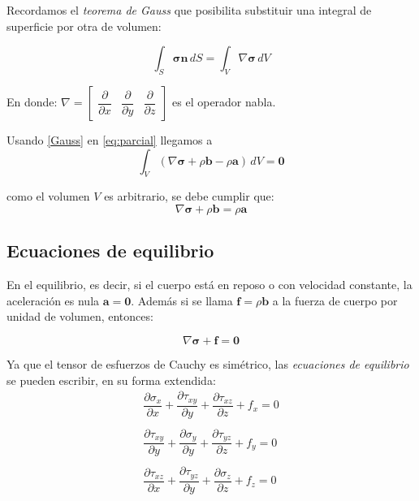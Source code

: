 	Recordamos el \textit{teorema de Gauss} que posibilita substituir una integral de superficie por otra de volumen:
	
	\begin{equation}
		\int_S \bm{\sigma} \mathbf{n} \, dS = \int_V \nabla
		\bm{\sigma} \, dV
		\label{Gauss}
	\end{equation}

En donde: $\nabla = \begin{bmatrix}
	\dfrac{\partial}{\partial x} & \dfrac{\partial}{\partial y} & \dfrac{\partial}{\partial z}
\end{bmatrix}$ es el operador nabla.
	
	Usando \eqref{Gauss} en \eqref{eq:parcial} llegamos a
	\begin{equation}
		\int_V \left( \nabla \bm{\sigma}  + \rho \mathbf{b} - \rho
		\mathbf{a} \right) \, dV = \mathbf{0}
	\end{equation}
	
	como el volumen $V$ es arbitrario, se debe cumplir que:
	\begin{equation}
		\nabla \bm{\sigma} + \rho \mathbf{b} = \rho \mathbf{a}
		\label{mov1}
	\end{equation}
	
	\subsection{Ecuaciones de equilibrio}
	
	En el equilibrio, es decir, si el cuerpo está en reposo o con velocidad constante, la aceleración es nula $\mathbf{a} = \mathbf{0}$. Además si se llama $\mathbf{f} = \rho \mathbf{b}$ a la fuerza de cuerpo por unidad de volumen, entonces:
	
	\begin{equation}
		\boxed{\nabla \bm{\sigma} + \mathbf{f} = \mathbf{0}}
		\label{eq:equil}
	\end{equation}
	
	Ya que el tensor de esfuerzos de Cauchy es simétrico, las \textit{ecuaciones de equilibrio} se pueden escribir, en su forma extendida:
	\begin{equation}
		\begin{array}{c}
			\dfrac{\partial \sigma_{x}}{\partial x} + \dfrac{\partial
				\tau_{xy}}{\partial y} + \dfrac{\partial \tau_{xz}}{\partial
				z} + f_x = 0 \\ \\
			\dfrac{\partial \tau_{xy}}{\partial y} + \dfrac{\partial
				\sigma_{y}}{\partial y} + \dfrac{\partial \tau_{yz}}{\partial
				z} + f_y = 0 \\ \\
			\dfrac{\partial \tau_{xz}}{\partial x} + \dfrac{\partial
				\tau_{yz}}{\partial y} + \dfrac{\partial \sigma_{z}}{\partial
				z} + f_z =0
		\end{array}
	\end{equation}
	
